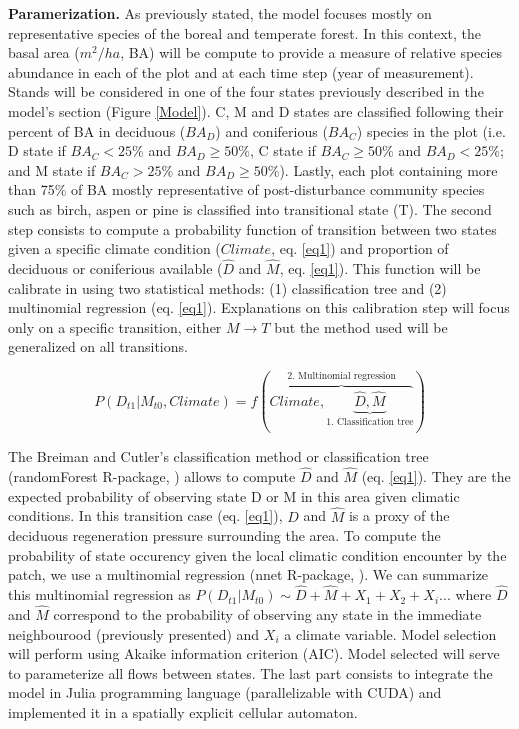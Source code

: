\textbf{Paramerization.} As previously stated, the model focuses mostly on
representative species of the boreal and temperate forest. In this context,
the basal area ($m^2/ha$, BA) will be compute to provide a measure of relative
species abundance in each of the plot and at each time step (year of
measurement). Stands will be considered in one of the four states previously
described in the model's section (Figure \ref{Model}). C, M and D states are
classified following their percent of BA in deciduous ($BA_D$) and coniferious
($BA_C$) species in the plot (i.e. D state if $BA_C < 25\%$ and $BA_D \geq
50\%$, C state if ${BA}_C \geq 50\%$ and $BA_D < 25\%$; and M state if $BA_C >
25\%$ and $BA_D \geq 50\%$). Lastly, each plot containing more than 75\% of BA
mostly representative of post-disturbance community species such as birch,
aspen or pine is classified into transitional state (T). The second step
consists to compute a probability function of transition between two states
given a specific climate condition ($Climate$, eq. \ref{eq1}) and proportion
of deciduous or coniferious available ($\hat{D}$ and $\hat{M}$, eq.
\ref{eq1}). This function will be calibrate in using two statistical methods:
(1) classification tree and (2) multinomial regression (eq. \ref{eq1}).
Explanations on this calibration step will focus only on a specific
transition, either $M \rightarrow T$ but the method used will be generalized
on all transitions.

\vspace{-1em}
\begin{equation}
	P(D_{t1}|M_{t0}, Climate) = f(\overbrace{Climate, \underbrace{\hat{D}, \hat{M}}_\text{1. Classification tree}}^\text{2. Multinomial regression})
\label{eq1}
\end{equation}

The Breiman and Cutler's classification method or classification tree
(randomForest R-package, \cite{Liaw2002a}) allows to compute $\hat{D}$ and
$\hat{M}$ (eq. \ref{eq1}). They are the expected probability of observing
state D or M in this area given climatic conditions. In this transition case
(eq. \ref{eq1}), $\hat{D}$ and $\hat{M}$ is a proxy of the deciduous
regeneration pressure surrounding the area. To compute the probability of
state occurency given the local climatic condition encounter by the patch, we
use a multinomial regression (nnet R-package, \cite{Venables2002}). We can
summarize this multinomial regression as $P(D_{t1}|M_{t0}) \sim \hat{D} +
\hat{M} + X_1+X_2+X_i... $ where $\hat{D}$ and $\hat{M}$ correspond to the
probability of observing any state in the immediate neighbourood (previously
presented) and $X_i$ a climate variable. Model selection will perform using
Akaike information criterion (AIC). Model selected will serve to parameterize
all flows between states. The last part consists to integrate the model in
Julia programming language (parallelizable with CUDA) and implemented it in a
spatially explicit cellular automaton.\\

